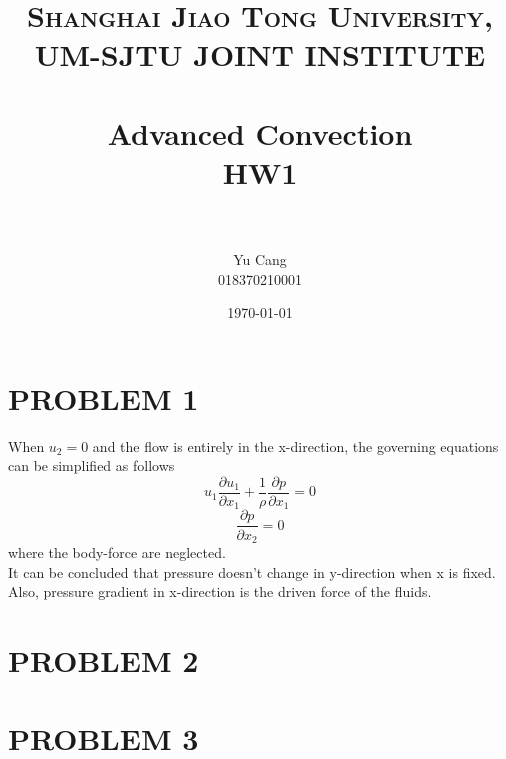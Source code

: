 \documentclass[paper=a4, fontsize=11pt]{scrartcl} %
\title{\normalfont \normalsize 
	\textsc{Shanghai Jiao Tong University, UM-SJTU JOINT INSTITUTE} \\ [25pt]
	\horrule{0.5pt} \\[0.4cm] 
	\huge Advanced Convection \\ HW1 \\
	\horrule{2pt} \\[0.5cm]}
\author{Yu Cang \\ 018370210001}
\date{\normalsize \today}
\numberwithin{equation}{section} %
\numberwithin{figure}{section} %
\numberwithin{table}{section} %
\begin{document}
\maketitle

\section{PROBLEM 1}
When $u_2= 0$ and the flow is entirely in the x-direction, the governing equations can be simplified as follows
\begin{equation}
	u_1 \frac{\partial u_1}{\partial x_1} + \frac{1}{\rho}\frac{\partial p}{\partial x_1} = 0
\end{equation}
\begin{equation}
	\frac{\partial p}{\partial x_2} = 0
\end{equation}
where the body-force are neglected.\\
It can be concluded that pressure doesn't change in y-direction when x is fixed.\\
Also, pressure gradient in x-direction is the driven force of the fluids.

\section{PROBLEM 2}

\section{PROBLEM 3}
\end{document}
